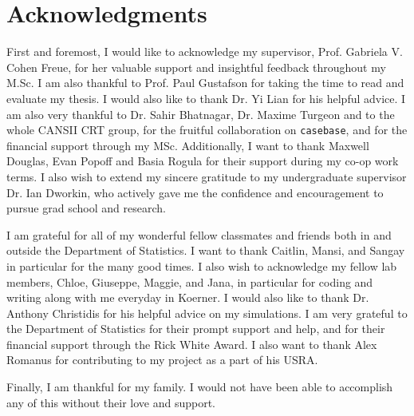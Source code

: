 
\chapter{Acknowledgments}

First and foremost, I would like to acknowledge my supervisor, Prof. Gabriela V. Cohen Freue, for her valuable support and insightful feedback throughout my M.Sc. I am also thankful to Prof. Paul Gustafson for taking the time to read and evaluate my thesis. I would also like to thank Dr. Yi Lian for his helpful advice. I am also very thankful to Dr. Sahir Bhatnagar, Dr. Maxime Turgeon and to the whole CANSII CRT group, for the fruitful collaboration on \texttt{casebase}, and for the financial support through my MSc. Additionally, I want to thank Maxwell Douglas, Evan Popoff and Basia Rogula for their support during my co-op work terms. I also wish to extend my sincere gratitude to my undergraduate supervisor Dr. Ian Dworkin, who actively gave me the confidence and encouragement to pursue grad school and research.
\bigskip \par
I am grateful for all of my wonderful fellow classmates and friends both in and outside the Department of Statistics. I want to thank Caitlin, Mansi, and Sangay in particular for the many good times. I also wish to acknowledge my fellow lab members, Chloe, Giuseppe, Maggie, and Jana, in particular for coding and writing along with me everyday in Koerner. I would also like to thank Dr. Anthony Christidis for his helpful advice on my simulations. I am very grateful to the Department of Statistics for their prompt support and help, and for their financial support through the Rick White Award. I also want to thank Alex Romanus for contributing to my project as a part of his USRA.
\bigskip \par
Finally, I am thankful for my family. I would not have been able to accomplish any of this without their love and support.

\bigskip \par


